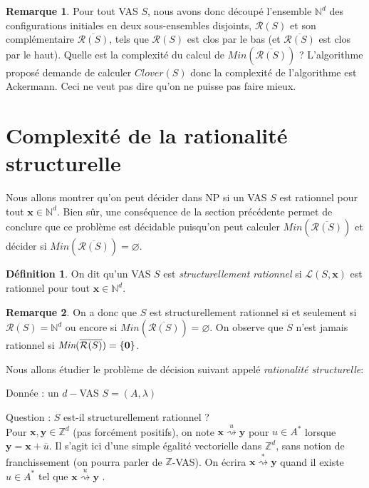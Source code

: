 \documentclass[a4paper,final]{article}
\theoremstyle{definition}
\newtheorem{Definition}[Theorem]{Définition}
\newtheorem*{Remark}{Remarque}
\newcommand{\os}[1]{\left\{\mathinner{#1}\right\}}
\let\vide\varnothing
\newcommand{\Min}{\textit{Min}}
\newcommand{\N}{\ensuremath{\mathbb{N}}}
\newcommand{\Z}{\ensuremath{\mathbb{Z}}}
\newcommand{\lang}{\ensuremath{\mathcal{L}}}
\newcommand{\clover}{\textit{Clover}}
\newcommand{\transZ}[1]{\ensuremath{\stackrel{#1}{\rightsquigarrow}}}
\newcommand{\vect}[1]{\ensuremath{\mathbf{#1}}}
\newcommand{\valeur}[1]{\ensuremath{\overline{#1}}}
\newcommand{\inirat}{\mathcal{R}}
\begin{document}
\begin{Remark}
Pour tout VAS $S$, nous avons donc découpé l'ensemble $\N^d$ des configurations initiales en deux sous-ensembles disjoints, $\inirat(S)$ et son complémentaire $\overline{\inirat(S)}$, tels que $\inirat(S)$ est clos par le bas (et $\overline{\inirat(S)}$ est clos par le haut).
Quelle est la complexité du calcul de $\Min(\overline{\inirat(S)})$ ? L'algorithme proposé demande de calculer $\clover(S)$ donc la complexité de l'algorithme est Ackermann. Ceci ne veut pas dire qu'on ne puisse pas faire mieux. 
\end{Remark}

\section{Complexité de la rationalité structurelle}

Nous allons montrer qu'on peut décider dans NP si un VAS $S$ est rationnel pour tout $\vect{x} \in \N^d$. Bien sûr, une conséquence de la section précédente permet de conclure que ce problème est décidable puisqu'on peut calculer $\Min(\overline{\inirat(S)})$ et décider si $\Min(\overline{\inirat(S)})=\vide$.

\begin{Definition}
On dit qu'un VAS $S$ est \emph{structurellement rationnel} si $\lang(S,\vect{x})$ est rationnel pour tout $\vect{x} \in \N^d$.
\end{Definition}

\begin{Remark}
On a donc que $S$ est structurellement rationnel si et seulement si $\inirat(S) = \N^d$ ou encore si
 $\Min(\overline{\inirat(S)})=\vide$. On observe que $S$ n'est jamais rationnel si $\Min(\overline{\inirat(S)})=\os{\vect{0}}$.  
\end{Remark}

Nous allons étudier le problème de décision suivant appelé \emph{rationalité structurelle}:

Donnée : un $d-$VAS $S=(A,\lambda)$

Question : $S$ est-il structurellement rationnel ? \\

Pour $\vect{x},\vect{y}\in\Z^d$ (pas forcément positifs), on note $\vect{x} \transZ{u} \vect{y}$ pour $u\in A^*$ lorsque $\vect{y} = \vect{x} + \valeur{u}$.
Il s'agit ici d'une simple égalité vectorielle dans $\Z^d$, sans notion de franchissement (on pourra parler de $\Z$-VAS).
On écrira $\vect{x} \transZ{*} \vect{y}$ quand il existe $u\in A^*$ tel que $\vect{x} \transZ{u} \vect{y}$ .
\end{document}
